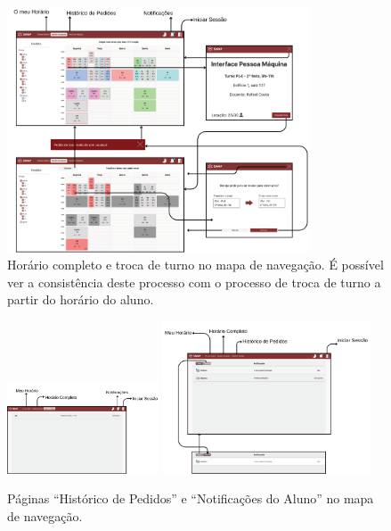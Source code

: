 \documentclass[12pt, a4paper]{article}
\begin{document}
\begin{figure}[H]
    \centering
    \includegraphics[width=0.8\textwidth]{res/navigation/3.png}
    \caption{
        \onehalfspacing
        Horário completo e troca de turno no mapa de navegação. É possível ver a consistência deste
        processo com o processo de troca de turno a partir do horário do aluno.
    }
    \label{navigation-3}
\end{figure}

\begin{figure}[H]
    \centering
    \includegraphics[width=0.4\textwidth]{res/navigation/4.png}
    \includegraphics[width=0.55\textwidth]{res/navigation/5.png}
    \caption{Páginas ``Histórico de Pedidos'' e ``Notificações do Aluno'' no mapa de navegação.}
    \label{navigation-4-5}
\end{figure}
\end{document}
